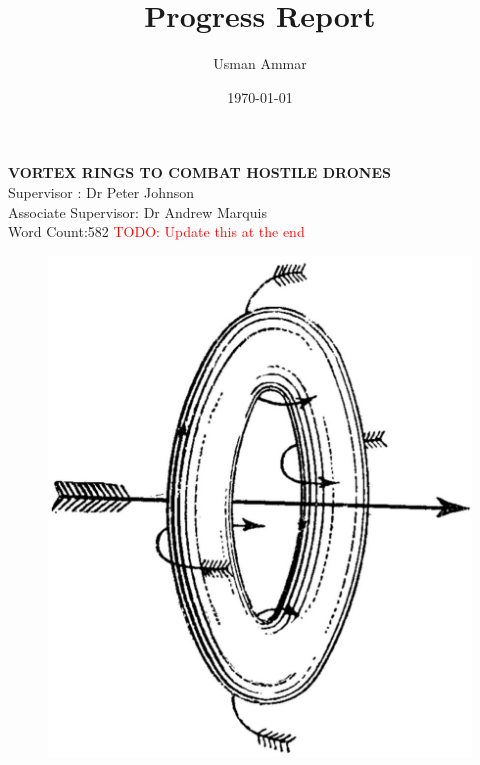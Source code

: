 \documentclass[a4paper,12pt]{article}
\title{\Huge{Progress Report}}
\author{Usman Ammar }
\date{\today}
\begin{document}
\maketitle
\vspace{-13mm}
\hrulefill 

\begin{center}
   
    \large\textbf{VORTEX RINGS TO COMBAT HOSTILE DRONES} \\
    Supervisor : Dr Peter Johnson \\
    Associate Supervisor: Dr Andrew Marquis \\
    Word Count:582 \textcolor{red}{TODO: Update this at the end }
\end{center}
 \begin{figure}[h!]
     \centering
     \includegraphics[width=0.7\linewidth]{vortex_titlepage.jpg}
     \caption{\cite{Helmholtz1858}}
     \label{fig:my_label}
 \end{figure}
\newpage
\end{document}
